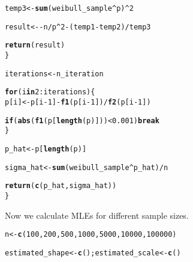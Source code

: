 \documentclass[11pt, a4paper]{article}\usepackage[]{graphicx}\usepackage[]{xcolor}
\makeatletter
\newcommand{\hlnum}[1]{\textcolor[rgb]{0.686,0.059,0.569}{#1}}%
\newcommand{\hlopt}[1]{\textcolor[rgb]{0,0,0}{#1}}%
\newcommand{\hldef}[1]{\textcolor[rgb]{0.345,0.345,0.345}{#1}}%
\newcommand{\hlkwa}[1]{\textcolor[rgb]{0.161,0.373,0.58}{\textbf{#1}}}%
\newcommand{\hlkwb}[1]{\textcolor[rgb]{0.69,0.353,0.396}{#1}}%
\newcommand{\hlkwd}[1]{\textcolor[rgb]{0.737,0.353,0.396}{\textbf{#1}}}%
\newenvironment{kframe}{%
 \def\at@end@of@kframe{}%
 \ifinner\ifhmode%
  \def\at@end@of@kframe{\end{minipage}}%
  \begin{minipage}{\columnwidth}%
 \fi\fi%
 \def\FrameCommand##1{\hskip\@totalleftmargin \hskip-\fboxsep
 \colorbox{shadecolor}{##1}\hskip-\fboxsep
     \hskip-\linewidth \hskip-\@totalleftmargin \hskip\columnwidth}%
 \MakeFramed {\advance\hsize-\width
   \@totalleftmargin\z@ \linewidth\hsize
   \@setminipage}}%
 {\par\unskip\endMakeFramed%
 \at@end@of@kframe}
\newenvironment{knitrout}{}{} %
\makeatother
\begin{document}
\begin{knitrout}
\begin{kframe}
\begin{alltt}
    \hldef{temp3} \hlkwb{<-} \hlkwd{sum}\hldef{(weibull_sample}\hlopt{^}\hldef{p)}\hlopt{^}\hlnum{2}

    \hldef{result} \hlkwb{<-} \hlopt{-} \hldef{n} \hlopt{/} \hldef{p}\hlopt{^}\hlnum{2} \hlopt{-} \hldef{(temp1} \hlopt{-} \hldef{temp2)} \hlopt{/} \hldef{temp3}

    \hlkwd{return}\hldef{(result)}
  \hldef{\}}

  \hldef{iterations} \hlkwb{<-} \hldef{n_iteration}

  \hlkwa{for} \hldef{(i} \hlkwa{in} \hlnum{2}\hlopt{:}\hldef{iterations) \{}
    \hldef{p[i]} \hlkwb{<-} \hldef{p[i}\hlopt{-}\hlnum{1}\hldef{]} \hlopt{-} \hlkwd{f1}\hldef{(p[i}\hlopt{-}\hlnum{1}\hldef{])} \hlopt{/} \hlkwd{f2}\hldef{(p[i}\hlopt{-}\hlnum{1}\hldef{])}

    \hlkwa{if}\hldef{(}\hlkwd{abs}\hldef{(}\hlkwd{f1}\hldef{(p[}\hlkwd{length}\hldef{(p)]))} \hlopt{<} \hlnum{0.001}\hldef{)} \hlkwa{break}
  \hldef{\}}

  \hldef{p_hat} \hlkwb{<-} \hldef{p[}\hlkwd{length}\hldef{(p)]}

  \hldef{sigma_hat} \hlkwb{<-} \hlkwd{sum}\hldef{(weibull_sample}\hlopt{^}\hldef{p_hat)} \hlopt{/} \hldef{n}

  \hlkwd{return}\hldef{(}\hlkwd{c}\hldef{(p_hat, sigma_hat))}
\hldef{\}}
\end{alltt}
\end{kframe}
\end{knitrout}

Now we calculate MLEs for different sample sizes.

\begin{knitrout}
\color{fgcolor}\begin{kframe}
\begin{alltt}
\hldef{n} \hlkwb{<-} \hlkwd{c}\hldef{(}\hlnum{100}\hldef{,} \hlnum{200}\hldef{,} \hlnum{500}\hldef{,} \hlnum{1000}\hldef{,} \hlnum{5000}\hldef{,} \hlnum{10000}\hldef{,} \hlnum{100000}\hldef{)}
\end{alltt}
\end{kframe}
\end{knitrout}

\begin{knitrout}
\color{fgcolor}\begin{kframe}
\begin{alltt}
\hldef{estimated_shape} \hlkwb{<-} \hlkwd{c}\hldef{(); estimated_scale} \hlkwb{<-} \hlkwd{c}\hldef{()}
\end{alltt}
\end{kframe}
\end{knitrout}
\end{document}
